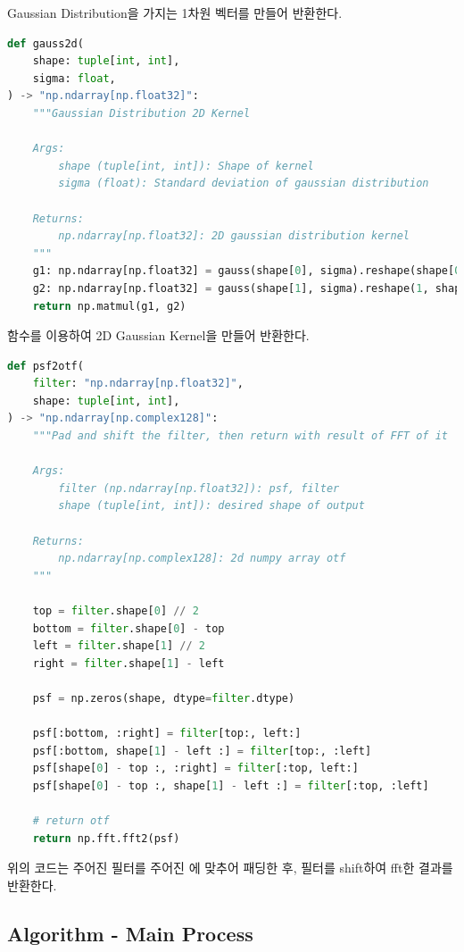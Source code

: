\documentclass{report}
\begin{document}
Gaussian Distribution을 가지는 1차원 벡터를 만들어 반환한다.

\begin{lstlisting}[language=Python, caption=Primitive - gauss2d, firstnumber=235]
def gauss2d(
    shape: tuple[int, int],
    sigma: float,
) -> "np.ndarray[np.float32]":
    """Gaussian Distribution 2D Kernel

    Args:
        shape (tuple[int, int]): Shape of kernel
        sigma (float): Standard deviation of gaussian distribution

    Returns:
        np.ndarray[np.float32]: 2D gaussian distribution kernel
    """
    g1: np.ndarray[np.float32] = gauss(shape[0], sigma).reshape(shape[0], 1)
    g2: np.ndarray[np.float32] = gauss(shape[1], sigma).reshape(1, shape[1])
    return np.matmul(g1, g2)
\end{lstlisting}

 함수를 이용하여 2D Gaussian Kernel을 만들어 반환한다.

\begin{lstlisting}[language=Python, caption=Primitive - psf2otf, firstnumber=252]
def psf2otf(
    filter: "np.ndarray[np.float32]",
    shape: tuple[int, int],
) -> "np.ndarray[np.complex128]":
    """Pad and shift the filter, then return with result of FFT of it

    Args:
        filter (np.ndarray[np.float32]): psf, filter
        shape (tuple[int, int]): desired shape of output

    Returns:
        np.ndarray[np.complex128]: 2d numpy array otf
    """

    top = filter.shape[0] // 2
    bottom = filter.shape[0] - top
    left = filter.shape[1] // 2
    right = filter.shape[1] - left

    psf = np.zeros(shape, dtype=filter.dtype)

    psf[:bottom, :right] = filter[top:, left:]
    psf[:bottom, shape[1] - left :] = filter[top:, :left]
    psf[shape[0] - top :, :right] = filter[:top, left:]
    psf[shape[0] - top :, shape[1] - left :] = filter[:top, :left]

    # return otf
    return np.fft.fft2(psf)
\end{lstlisting}

위의 코드는 주어진 필터를 주어진 에 맞추어 패딩한 후, 필터를 shift하여 fft한 결과를 반환한다.

\subsection*{Algorithm - Main Process}
\end{document}
